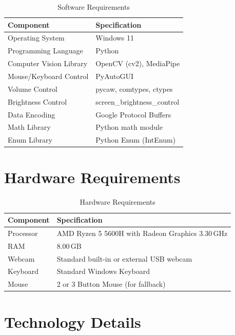 \documentclass[12pt,a4paper]{report}
\begin{document}
\begin{table}[ht]
\centering
\caption{Software Requirements}
\begin{tabular}{ll}
\toprule
\textbf{Component} & \textbf{Specification} \\
\midrule
Operating System       & Windows 11 \\
Programming Language   & Python \\
Computer Vision Library & OpenCV (cv2), MediaPipe \\
Mouse/Keyboard Control & PyAutoGUI \\
Volume Control         & pycaw, comtypes, ctypes \\
Brightness Control     & screen\_brightness\_control \\
Data Encoding          & Google Protocol Buffers \\
Math Library           & Python math module \\
Enum Library           & Python Enum (IntEnum) \\
\bottomrule
\end{tabular}
\end{table}

\section{Hardware Requirements}

\begin{table}[ht]
\centering
\caption{Hardware Requirements}
\begin{tabular}{ll}
\toprule
\textbf{Component} & \textbf{Specification} \\
\midrule
Processor & AMD Ryzen 5 5600H with Radeon Graphics 3.30\,GHz \\
RAM       & 8.00\,GB \\
Webcam    & Standard built-in or external USB webcam \\
Keyboard  & Standard Windows Keyboard \\
Mouse     & 2 or 3 Button Mouse (for fallback) \\
\bottomrule
\end{tabular}
\end{table}

\section{Technology Details}
\end{document}
